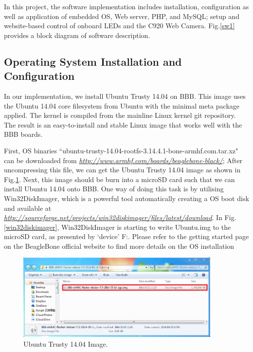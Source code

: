 \documentclass[12pt,journal,draftclsnofoot,onecolumn]{IEEEtran}
\begin{document}
In this project, the software implementation includes installation, configuration as well as application of embedded OS, Web server, PHP, and MySQL; setup and website-based control of onboard LEDs and the C920 Web Camera. Fig.\ref{sw1} provides a block diagram of software description.

	\subsection{Operating System Installation and Configuration}\label{Sys}
	In our implementation, we install Ubuntu Trusty 14.04 on BBB. This image uses the Ubuntu 14.04 core filesystem from Ubuntu with the minimal meta package applied. The kernel is compiled from the mainline Linux kernel git repository. The result is an easy-to-install and stable Linux image that works well with the BBB boards.

First, OS binaries ``ubuntu-trusty-14.04-rootfs-3.14.4.1-bone-armhf.com.tar.xz" can be downloaded from \textcolor{blue}{\textit{\url{http://www.armhf.com/boards/beaglebone-black/}}}; After uncompressing this file, we can get the Ubuntu Trusty 14.04 image as shown in Fig.\ref{osimage}. Next, this image should be burn into a microSD card such that we can install Ubuntu 14.04 onto BBB. One way of doing this task is by utilising Win32DiskImager, which is a powerful tool automatically creating a OS boot disk and available at \textcolor{blue}{\textit{\url{http://sourceforge.net/projects/win32diskimager/files/latest/download}}}. In Fig.\ref{win32diskimager}, Win32DiskImager is starting to write Ubuntu.img to the microSD card, as presented by `device' F:. Please refer to the getting started page on the BeagleBone official website \cite{startBB} to find more details on the OS installation

\begin{figure}[htb]
	\centering
	\includegraphics[width=4in]{./figs/osimage.PNG}
	\caption{Ubuntu Trusty 14.04 Image.}
	\label{osimage}
\end{figure}
\end{document}
